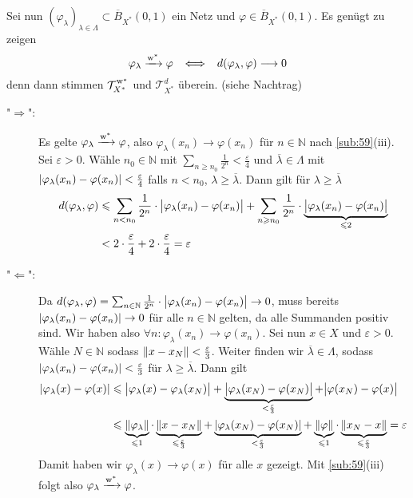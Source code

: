 \noindent Sei nun $(\varphi_\lambda)_{\lambda \in \Lambda} \subset \overline{B}_{X^*}(0,1)$ ein Netz und $\varphi \in \overline{B}_{X^*}(0,1)$. Es genügt zu zeigen
\[
	\varphi_\lambda \xrightarrow{\w^*} \varphi \enspace \iff \enspace  d(\varphi_\lambda, \varphi) \longrightarrow 0
\]
denn dann stimmen $\weakTstar{X^*}$ und $\mathcal{T}_{X^*}^d$ überein. (siehe Nachtrag)
\begin{description}
	\item["$\Rightarrow $":] Es gelte $\varphi_\lambda \xrightarrow{\w^*} \varphi$, also $\varphi_\lambda(x_n) \to \varphi(x_n)$ für $n \in \mathds{N}$ nach 
	\ref{sub:59}(iii). Sei $\varepsilon>0$. Wähle $n_0 \in \mathds{N}$ mit $\sum_{n \ge n_0} \frac{1}{2^n} < \frac{\varepsilon}{4}$ und $\overline{\lambda} \in \Lambda$
	mit $\abs*{\varphi_\lambda(x_n)- \varphi(x_n)} < \frac{\varepsilon}{4}$ falls $n < n_0$, $\lambda \ge \overline{\lambda}$. Dann gilt für $\lambda \ge\overline{\lambda}$
	\begin{align*}
		d(\varphi_\lambda,\varphi) &\le \sum_{n < n_0} \frac{1}{2^n} \cdot \abs[\big]{\varphi_\lambda(x_n)- \varphi(x_n)} + \sum_{n \ge n_0} \frac{1}{2^n} \cdot 
		\underbrace{\abs[\big]{\varphi_\lambda(x_n) - \varphi(x_n)}}_{\le 2} \\
		&< 2 \cdot \frac{\varepsilon}{4} + 2 \cdot \frac{\varepsilon}{4}  = \varepsilon
	\end{align*}
	\item["$\Leftarrow$":] Da $d(\varphi_\lambda, \varphi) = \sum_{n \in \mathds{N}} \frac{1}{2^n} \cdot \abs[\big]{\varphi_\lambda(x_n) - \varphi(x_n)} \to 0$, muss bereits
	$\abs*{\varphi_\lambda(x_n)- \varphi(x_n)} \to 0$ für alle $n \in \mathds{N}$ gelten, da alle Summanden positiv sind. Wir haben also 
	$\forall n : \varphi_\lambda(x_n) \to \varphi(x_n)$. Sei nun $x \in X$ und $\varepsilon>0$. Wähle $N \in \mathds{N}$ sodass $\norm{x-x_N} < \frac{\varepsilon}{3} $. Weiter finden wir 
	$\overline{\lambda} \in \Lambda$, sodass $\abs*{\varphi_\lambda(x_n)- \varphi(x_n)}< \frac{\varepsilon}{3}$ für $\lambda \ge \overline{\lambda}$. Dann gilt
	\begin{align*}
		\abs*{\varphi_\lambda(x)- \varphi(x)} &\le \abs[\big]{\varphi_\lambda(x)- \varphi_\lambda(x_N)} + 
		\underbrace{\abs[\big]{\varphi_\lambda(x_N) - \varphi(x_N)}}_{< \frac{\varepsilon}{3}} + \abs[\big]{\varphi(x_N)- \varphi(x)}    \\
		&\le \underbrace{\norm{\varphi_\lambda}}_{\le 1} \cdot \underbrace{\norm{x-x_N}}_{\le \frac{\varepsilon}{3}} 
		+ \underbrace{\abs*{\varphi_\lambda(x_N) - \varphi(x_N)}}_{< \frac{\varepsilon}{3}} 
		+ \underbrace{\norm{\varphi}}_{\le 1} \cdot \underbrace{\norm{x_N-x}}_{\le \frac{\varepsilon}{3} } = \varepsilon
	\end{align*}
	Damit haben wir $\varphi_\lambda(x) \to \varphi(x)$ für alle $x$ gezeigt. Mit \ref{sub:59}(iii) folgt also $\varphi_\lambda \xrightarrow{\w^*} \varphi$. \bewende
\end{description}
